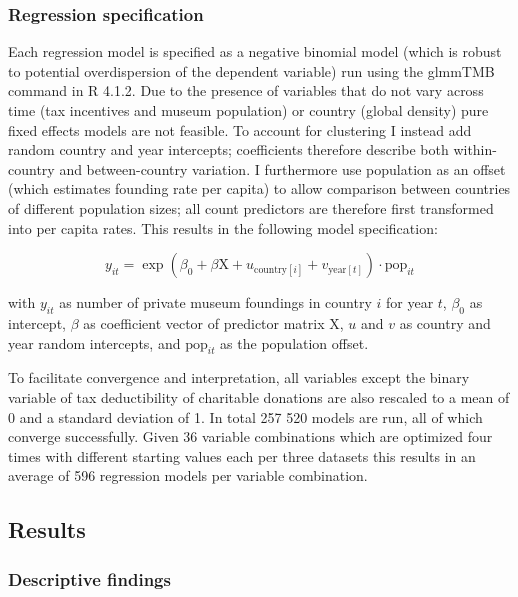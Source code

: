 \documentclass[11pt, authoryear]{elsarticle}
\begin{document}
\subsubsection*{Regression specification}

Each regression model is specified as a negative binomial model (which is robust to potential overdispersion of the dependent variable) run using the glmmTMB command in R 4.1.2. 
Due to the presence of variables that do not vary across time (tax incentives and museum population) or country (global density) pure fixed effects models are not feasible. 
To account for clustering I instead add random country and year intercepts; coefficients therefore describe both within-country and between-country variation. 
I furthermore use population as an offset (which estimates founding rate per capita) to allow comparison between countries of different population sizes; all count predictors are therefore first transformed into per capita rates.
This results in the following model specification:

\begin{equation*}
y_{it} = \exp(\beta_0 + \beta \text{X} + u_{\text{country}[i]} + v_{\text{year}[t]}) \cdot \text{pop}_{it}
\end{equation*}

with \(y_{it}\) as number of private museum foundings in country \(i\) for year \(t\), \(\beta_0\) as intercept, \(\beta\) as coefficient vector of predictor matrix \(\text{X}\), \(u\) and \(v\) as country and year random intercepts, and \(\text{pop}_{it}\) as the population offset.


To facilitate convergence and interpretation, all variables except the binary variable of tax deductibility of charitable donations are also rescaled to a mean of 0 and a standard deviation of 1. 
In total 257 520 models are run, all of which converge successfully. 
Given 36 variable combinations which are optimized four times with different starting values each per three datasets this results in an average of 596 regression models per variable combination.



\subsection*{Results}


\subsubsection*{Descriptive findings}
\end{document}
